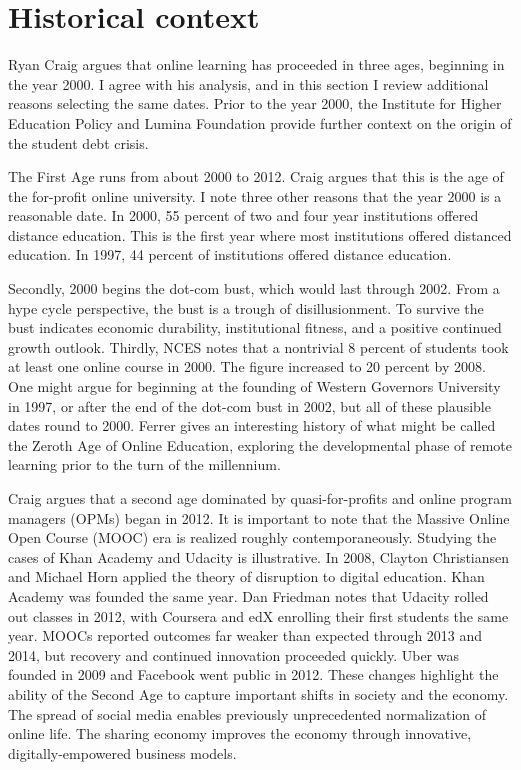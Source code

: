 \documentclass[review]{elsarticle}
\begin{document}
\section{Historical context}

Ryan Craig argues that online learning has proceeded in three ages, beginning in the year 2000.
I agree with his analysis,
and in this section I review additional reasons selecting the same dates.
Prior to the year 2000,
the Institute for Higher Education Policy and Lumina Foundation provide further context
on the origin of the student debt crisis\cite{foundation_2017}.

The First Age runs from about 2000 to 2012.
Craig argues that this is the age of the for-profit online university.
I note three other reasons that the year 2000 is a reasonable date.
In 2000, 55 percent of two and four year institutions offered distance education\cite{tabs2003distance}.
This is the first year where most institutions offered distanced education.
In 1997, 44 percent of institutions offered distance education\cite{sikora2002profile}.

Secondly, 2000 begins the dot-com bust, which would last through 2002\cite{wollscheid2012rise}.
From a hype cycle perspective, the bust is a trough of disillusionment.
To survive the bust indicates economic durability, institutional fitness, and a positive continued growth outlook.
Thirdly, NCES notes that a nontrivial 8 percent of students took at least one online course in 2000\cite{radford2011learning}.
The figure increased to 20 percent by 2008.
One might argue for beginning at the founding of Western Governors University in 1997, or after the end of the dot-com bust in 2002, but all of these plausible dates round to 2000.
Ferrer gives an interesting history of what might be called the Zeroth Age of Online Education, exploring the developmental phase of remote learning prior to the turn of the millennium\cite{ferrer_2019}.

Craig argues that a second age dominated by quasi-for-profits and online program managers (OPMs) began in 2012.
It is important to note that the Massive Online Open Course (MOOC) era is realized roughly contemporaneously.
Studying the cases of Khan Academy and Udacity is illustrative.
In 2008, Clayton Christiansen and Michael Horn applied the theory of disruption to digital education\cite{horn2008disrupting}.
Khan Academy was founded the same year\cite{tucker_2018}.
Dan Friedman\cite{friedman2014mooc} notes that Udacity rolled out classes in 2012, with Coursera and edX enrolling their first students the same year.
MOOCs reported outcomes far weaker than expected through 2013 and 2014, but recovery and continued innovation proceeded quickly.
Uber was founded in 2009 and Facebook went public in 2012.
These changes highlight the ability of the Second Age to capture important shifts in society and the economy.
The spread of social media enables previously unprecedented normalization of online life.
The sharing economy improves the economy through innovative, digitally-empowered business models.
\end{document}
